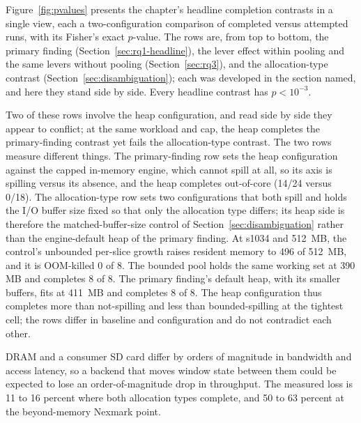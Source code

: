 Figure~\ref{fig:pvalues} presents the chapter's headline completion contrasts in a single view, each a two-configuration comparison of completed versus attempted runs, with its Fisher's exact $p$-value.
The rows are, from top to bottom, the primary finding (Section~\ref{sec:rq1-headline}), the lever effect within pooling and the same levers without pooling (Section~\ref{sec:rq3}), and the allocation-type contrast (Section~\ref{sec:disambiguation}); each was developed in the section named, and here they stand side by side.
Every headline contrast has $p < 10^{-3}$.

Two of these rows involve the heap configuration, and read side by side they appear to conflict; at the same workload and cap, the heap completes the primary-finding contrast yet fails the allocation-type contrast.
The two rows measure different things.
The primary-finding row sets the heap configuration against the capped in-memory engine, which cannot spill at all, so its axis is spilling versus its absence, and the heap completes out-of-core (14/24 versus 0/18).
The allocation-type row sets two configurations that both spill and holds the I/O buffer size fixed so that only the allocation type differs; its heap side is therefore the matched-buffer-size control of Section~\ref{sec:disambiguation} rather than the engine-default heap of the primary finding.
At s1034 and 512\, MB, the control's unbounded per-slice growth raises resident memory to 496 of 512\, MB, and it is OOM-killed 0 of 8.
The bounded pool holds the same working set at 390\, MB and completes 8 of 8.
The primary finding's default heap, with its smaller buffers, fits at 411\, MB and completes 8 of 8.
The heap configuration thus completes more than not-spilling and less than bounded-spilling at the tightest cell; the rows differ in baseline and configuration and do not contradict each other.

DRAM and a consumer SD card differ by orders of magnitude in bandwidth and access latency, so a backend that moves window state between them could be expected to lose an order-of-magnitude drop in throughput.
The measured loss is 11 to 16 percent where both allocation types complete, and 50 to 63 percent at the beyond-memory Nexmark point.

